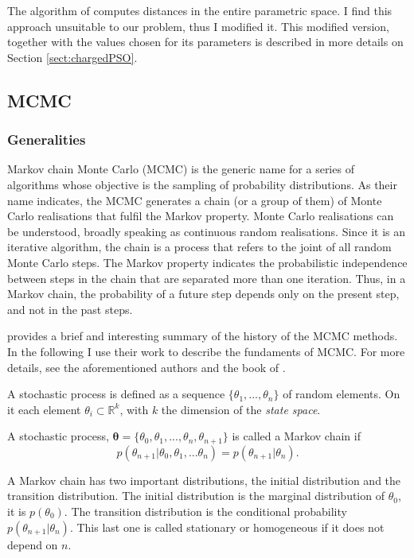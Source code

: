 The algorithm of \citet{Blackwell2002} computes distances in the entire parametric space. I find this approach unsuitable to our problem, thus I modified it. This modified version, together with the values chosen for its parameters is described in more details on Section \ref{sect:chargedPSO}. 

\subsection{MCMC}
\label{sect:MCMC}
\subsubsection{Generalities}
Markov chain Monte Carlo (MCMC) is the generic name for a series of algorithms whose objective is the sampling of probability distributions. As their name indicates, the MCMC generates a chain (or a group of them) of Monte Carlo realisations that fulfil the Markov property. Monte Carlo realisations can be understood, broadly speaking as continuous random realisations. Since it is an iterative algorithm, the chain is a process that refers to the joint of all random Monte Carlo steps. The Markov property indicates the probabilistic independence between steps in the chain that are separated more than one iteration. Thus, in a Markov chain, the probability of a future step depends only on the present step, and not in the past steps.

\citet{Andrieu2003} provides a brief and interesting summary of the history of the MCMC methods. In the following I use their work to describe the fundaments of MCMC. For more details, see the aforementioned authors and the book of \citet{Brooks2011}.

A stochastic process is defined as a sequence  $\{\theta_1,...,\theta_n\}$ of random elements. On it each element $\theta_i \subset \mathbb{R}^k$,  with $k$ the dimension of the \emph{state space}. 

A stochastic process, $\boldsymbol{\theta}=\{\theta_0,\theta_1,...,\theta_n,\theta_{n+1}\}$ is called a Markov chain if
\begin{equation}
p(\theta_{n+1} | \theta_0,\theta_1,...\theta_n) = p(\theta_{n+1} |\theta_n). \nonumber
\end{equation}

A Markov chain has two important distributions, the initial distribution and the transition distribution. The initial distribution is the marginal distribution of $\theta_0$, it is $p(\theta_0)$. The transition distribution is the conditional probability $p(\theta_{n+1} |\theta_n)$. This last one is called stationary or homogeneous if it does not depend on $n$.

